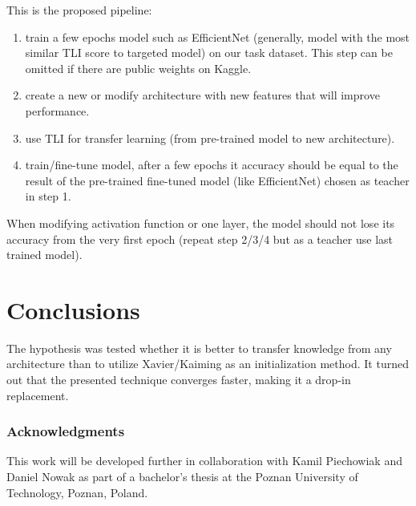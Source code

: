 \documentclass{article} %
\begin{document}
This is the proposed pipeline:
\begin{enumerate}
\item train a few epochs model such as EfficientNet (generally, model with the
most similar TLI score to targeted model) on our task dataset.
This step can be omitted if there are public weights on Kaggle.
\item create a new or modify architecture with new features that will improve performance.
\item use TLI for transfer learning (from pre-trained model to new architecture).
\item train/fine-tune model, after a few epochs it accuracy should be equal to the
result of the pre-trained fine-tuned model (like EfficientNet) chosen as teacher
in step 1.
\end{enumerate}
When modifying activation function or one layer, the model should not lose
its accuracy from the very first epoch (repeat step 2/3/4 but as a teacher use
last trained model).


\section{Conclusions}

The hypothesis was tested whether it is better to transfer knowledge from any
architecture than to utilize Xavier/Kaiming as an initialization method.
It turned out that the presented technique converges faster, making it a drop-in
replacement.



\subsubsection*{Acknowledgments}
This work will be developed further in collaboration with Kamil Piechowiak and Daniel Nowak as part of a bachelor's thesis at the Poznan University of Technology, Poznan, Poland.
\end{document}
